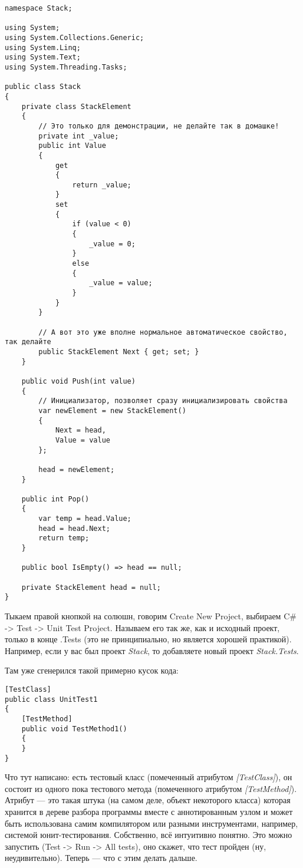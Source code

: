 \documentclass{../../text-style}
\begin{document}
\begin{verbatim}
namespace Stack;

using System;
using System.Collections.Generic;
using System.Linq;
using System.Text;
using System.Threading.Tasks;

public class Stack
{
    private class StackElement
    {
        // Это только для демонстрации, не делайте так в домашке!
        private int _value;
        public int Value
        {
            get
            {
                return _value;
            }
            set
            {
                if (value < 0)
                {
                    _value = 0;
                }
                else
                {
                    _value = value;
                }
            }
        }

        // А вот это уже вполне нормальное автоматическое свойство, так делайте
        public StackElement Next { get; set; }
    }

    public void Push(int value)
    {
        // Инициализатор, позволяет сразу инициализировать свойства
        var newElement = new StackElement()
        {
            Next = head,
            Value = value
        };

        head = newElement;
    }

    public int Pop()
    {
        var temp = head.Value;
        head = head.Next;
        return temp;
    }

    public bool IsEmpty() => head == null;

    private StackElement head = null;
}
\end{verbatim}

Тыкаем правой кнопкой на солюшн, говорим Create New Project, выбираем C\# -> Test -> Unit Test Project. Называем его так же, как и исходный проект, только в конце .Tests (это не принципиально, но является хорошей практикой). Например, если у вас был проект \textit{Stack}, то добавляете новый проект \textit{Stack.Tests}. 

Там уже сгенерился такой примерно кусок кода:

\begin{verbatim}
[TestClass]
public class UnitTest1
{
    [TestMethod]
    public void TestMethod1()
    {
    }
}
\end{verbatim}

Что тут написано: есть тестовый класс (помеченный атрибутом \textit{[TestClass]}), он состоит из одного пока тестового метода (помеченного атрибутом \textit{[TestMethod]}). Атрибут --- это такая штука (на самом деле, объект некоторого класса) которая хранится в дереве разбора программы вместе с аннотированным узлом и может быть использована самим компилятором или разными инструментами, например, системой юнит-тестирования. Собственно, всё интуитивно понятно. Это можно запустить (Test -> Run -> All tests), оно скажет, что тест пройден (ну, неудивительно). Теперь --- что с этим делать дальше.
\end{document}
